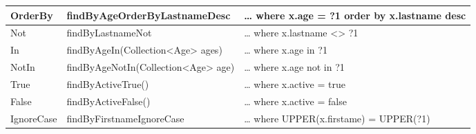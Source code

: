 \begin{longtable}{| p{.20\linewidth} | p{.30\linewidth} | p{.50\linewidth } |}
			\hline
			OrderBy &	findByAgeOrderByLastnameDesc	& … where x.age = ?1 order by x.lastname desc \\
			\hline
			Not &	findByLastnameNot	& … where x.lastname <> ?1 \\
			\hline
			In &	findByAgeIn(Collection<Age> \linebreak ages)	& … where x.age in ?1 \\
			\hline
			NotIn &	findByAgeNotIn(Collection<Age> \linebreak age)	& … where x.age not in ?1 \\
			\hline
			True &	findByActiveTrue()	& … where x.active = true \\
			\hline
			False &	findByActiveFalse()	& … where x.active = false \\
			\hline
			IgnoreCase &	findByFirstnameIgnoreCase	& … where UPPER(x.firstame) = UPPER(?1) \\
			\hline
	\end{longtable}